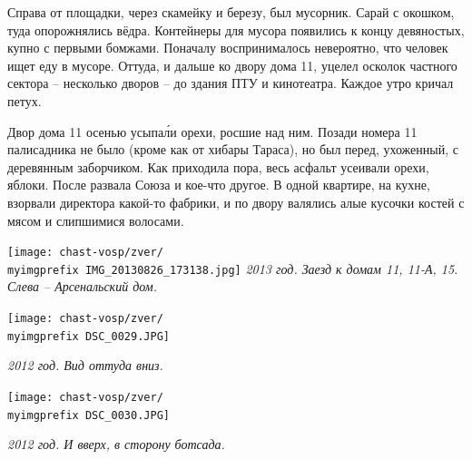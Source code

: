 Справа от площадки, через скамейку и березу, был мусорник. Сарай с окошком, туда опорожнялись вёдра. Контейнеры для мусора появились к концу девяностых, купно с первыми бомжами. Поначалу воспринималось невероятно, что человек ищет еду в мусоре. Оттуда, и дальше ко двору дома 11, уцелел осколок частного сектора – несколько дворов – до здания ПТУ и кинотеатра. Каждое утро кричал петух.

Двор дома 11 осенью усыпа\'ли орехи, росшие над ним. Позади номера 11 палисадника не было (кроме как от хибары Тараса), но был перед, ухоженный, с деревянным заборчиком. Как приходила пора, весь асфальт усеивали орехи, яблоки. После развала Союза и кое-что другое. В одной квартире, на кухне, взорвали директора какой-то фабрики, и по двору валялись алые кусочки костей с мясом и слипшимися волосами.

\vspace*{\fill}
\begin{center}
\texttt{[image: chast-vosp/zver/\\myimgprefix IMG\_20130826\_173138.jpg]}
\textit{2013 год. Заезд к домам 11, 11-А, 15. Слева – Арсенальский дом.}
\end{center}
\vspace*{\fill}
\newpage

\begin{center}
\texttt{[image: chast-vosp/zver/\\myimgprefix DSC\_0029.JPG]}

\textit{2012 год. Вид оттуда вниз.}
\end{center}

\begin{center}
\texttt{[image: chast-vosp/zver/\\myimgprefix DSC\_0030.JPG]}

\textit{2012 год. И вверх, в сторону ботсада.}
\end{center}

\newpage

